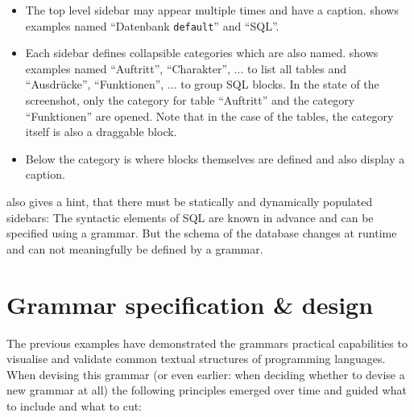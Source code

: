 \documentclass[]{report}
\begin{document}
\begin{itemize}
\item The top level sidebar may appear multiple times and have a caption.  shows examples named \enquote{Datenbank \texttt{default}} and \enquote{SQL}.
\item Each sidebar defines collapsible categories which are also named.  shows examples named \enquote{Auftritt}, \enquote{Charakter}, ... to list all tables and \enquote{Ausdrücke}, \enquote{Funktionen}, ... to group SQL blocks. In the state of the screenshot, only the category for table \enquote{Auftritt} and the category \enquote{Funktionen} are opened. Note that in the case of the tables, the category itself is also a draggable block.
\item Below the category is where blocks themselves are defined and also display a caption.
\end{itemize}

 also gives a hint, that there must be statically and dynamically populated sidebars: The syntactic elements of SQL are known in advance and can be specified using a grammar. But the schema of the database changes at runtime and can not meaningfully be defined by a grammar.

\section{Grammar specification \& design}
\label{sec:grammar-specification}

The previous examples have demonstrated the grammars practical capabilities to visualise and validate common textual structures of programming languages. When devising this grammar (or even earlier: when deciding whether to devise a new grammar at all) the following principles emerged over time and guided what to include and what to cut:
\end{document}
